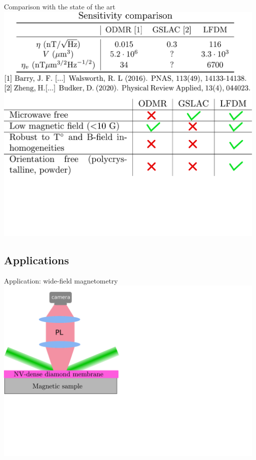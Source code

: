 \documentclass{beamer}
\begin{document}
\begin{frame}{Comparison with the state of the art}
\centering
\includegraphics[width=\textwidth,height=0.85\textheight,keepaspectratio]{Slide_comparison_litterature_f}
\end{frame}


\subsection{Applications}
\begin{frame}{Application: wide-field magnetometry}
\centering
\includegraphics[width=\textwidth,height=0.85\textheight,keepaspectratio]{Slide_applications_wide_field_f-3}
\end{frame}
\end{document}
